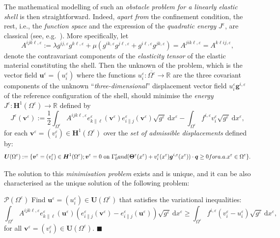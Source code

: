 \documentclass{amsart}
\newcommand*{\bqed}{\hfill\ensuremath{\blacksquare}}%
\def\dd{\, \mathrm{d}}
\begin{document}
The mathematical modelling of such an \emph{obstacle problem for a linearly elastic shell} is then straightforward. Indeed, \emph{apart from} the confinement condition, the rest, i.e., the \emph{function space} and the expression of the \emph{quadratic energy} $J^\varepsilon$, are classical (see, e.g.~\cite{Ciarlet2000}). More specifically, let
$$
A^{ijk\ell,\varepsilon} := \lambda g^{ij,\varepsilon} g^{k\ell,\varepsilon} + \mu \left( g^{ik,\varepsilon} g^{j\ell,\varepsilon} + g^{i\ell,\varepsilon} g^{jk,\varepsilon}\right) =A^{jik\ell,\varepsilon} =  A^{k\ell ij,\varepsilon},
$$
denote the contravariant components of the \emph{elasticity tensor} of the elastic material constituting the shell. Then the unknown of the problem, which is the vector field $\bm{u}^\varepsilon = (u^\varepsilon_i)$ where the functions $u^\varepsilon_i : \overline{\Omega^\varepsilon} \to \mathbb{R}$ are the three covariant components of the unknown ``\emph{three-dimensional}'' displacement vector field $u^\varepsilon_i \bm{g}^{i, \varepsilon}$ of the reference configuration of the shell, should minimise the \emph{energy} $J^\varepsilon:\bm{H}^1(\Omega^\varepsilon) \to \mathbb{R}$ defined by
$$
J^\varepsilon(\bm{v}^\varepsilon) := \frac{1}{2} \int_{\Omega^\varepsilon} A^{ijk\ell,\varepsilon} e^\varepsilon_{k\|\ell}(\bm{v}^\varepsilon)e^\varepsilon_{i\|j}(\bm{v}^\varepsilon) \sqrt{g^\varepsilon} \dd x^\varepsilon - \int_{\Omega^\varepsilon} f^{i,\varepsilon} v^\varepsilon_i \sqrt{g^\varepsilon} \dd x^\varepsilon,
$$
for each $\bm{v}^\varepsilon = (v^\varepsilon_i) \in \bm{H}^1(\Omega^\varepsilon)$
over the \emph{set of admissible displacements} defined by:
$$
\bm{U}(\Omega^\varepsilon) := \{\bm{v}^\varepsilon = (v^\varepsilon_i) \in \bm{H}^1 (\Omega^\varepsilon) ; \bm{v}^\varepsilon = \textbf{0} \text{ on } \Gamma^\varepsilon_0 \textup{ and } (\bm{\Theta}^\varepsilon(x^\varepsilon) + v^\varepsilon_i (x^\varepsilon) \bm{g}^{i, \varepsilon} (x^\varepsilon)) \cdot \bm{q} \ge 0 \textup{ for a.a. } x^\varepsilon \in \Omega^\varepsilon\}.
$$

The solution to this \emph{minimisation problem} exists and is unique, and it can be also characterised as the unique solution of the following problem:

\begin{customprob}{$\mathcal{P}(\Omega^\varepsilon)$}\label{problem0}
	Find $\bm{u}^\varepsilon =(u_i^\varepsilon)\in \bm{U}(\Omega^\varepsilon)$ that satisfies the variational inequalities:
	$$
	\int_{\Omega^\varepsilon}
	A^{ijk\ell, \varepsilon} e^\varepsilon_{k\| \ell}  (\bm{u}^\varepsilon)
	\left( e^\varepsilon_{i\| j}  (\bm{v}^\varepsilon) -  e^\varepsilon_{i\| j}  (\bm{u}^\varepsilon)  \right) \sqrt{g^\varepsilon} \dd x^\varepsilon \ge \int_{\Omega^\varepsilon} f^{i , \varepsilon} (v^\varepsilon_i - u^\varepsilon_i)\sqrt{g^\varepsilon} \dd x^\varepsilon,
	$$
	for all $\bm{v}^\varepsilon = (v^\varepsilon_i) \in \bm{U}(\Omega^\varepsilon)$.
	\bqed	
\end{customprob}
\end{document}

